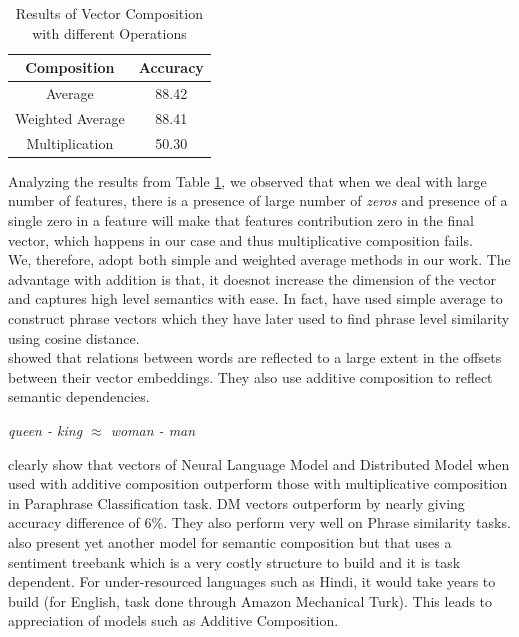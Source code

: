 \documentclass[11pt,a4paper]{article}
\begin{document}
\begin {table}[h!]
\centering
\begin{tabular}{ |c|c| }
\hline
Composition & Accuracy \\ \hline \hline
Average & 88.42 \\ \hline
Weighted Average & 88.41 \\ \hline
Multiplication & 50.30 \\ \hline
\end{tabular}
\caption {Results of Vector Composition with different Operations}
\label{table:composition}
\end{table}
Analyzing the results from Table \ref{table:composition}, we observed that when we deal with large number of features, there is a presence of large number of \emph{zeros} and presence of a single zero in a feature will make that features contribution zero in the final vector, which happens in our case and thus multiplicative composition fails.\\
We, therefore, adopt both simple and weighted average methods in our work. The advantage with addition is that, it doesnot increase the dimension of the vector and captures high level semantics with ease. In fact, \cite{Zou:13} have used simple average to construct phrase vectors which they have later used to find phrase level similarity using cosine distance.\\
\cite{Mikolov:13c} showed that relations between words are reflected to a large extent in the offsets between their vector embeddings. They also use additive composition to reflect semantic dependencies.
\begin{center}
\emph{queen - king $\approx$ woman - man}
\end{center}
\cite{Blacoe:12} clearly show that vectors of Neural Language Model and Distributed Model when used with additive composition outperform those with multiplicative composition in Paraphrase Classification task. DM vectors outperform by nearly giving accuracy difference of 6\%. They also perform very well on Phrase similarity tasks.\\
\cite{Socher:13} also present yet another model for semantic composition but that uses a sentiment treebank which is a very costly structure to build and it is task dependent. For under-resourced languages such as Hindi, it would take years to build (for English, task done through Amazon Mechanical Turk). This leads to appreciation of models such as Additive Composition.\\
\end{document}
